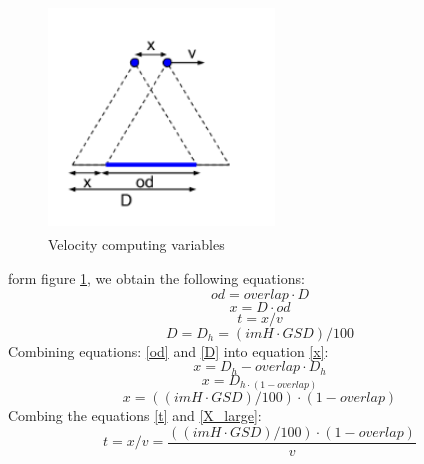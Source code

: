 \begin{figure}[H]
\centering
\includegraphics[width=6cm,height=6cm,keepaspectratio]{imagenes/velocity.PNG}
\caption{Velocity computing variables}
\label{fig:velocity}
\end{figure}
form figure \ref{fig:velocity}, we obtain the following equations:
\begin{equation}
od =overlap\cdot D
\label{od}
\end{equation}
\begin{equation}
x=D\cdot od
\label{x}
\end{equation}
\begin{equation}
t = x/v
\label{t}
\end{equation}
\begin{equation}
D=D_{h}=(imH\cdot GSD)/100
\label{D}
\end{equation}
Combining equations: \ref{od} and \ref{D} into equation \ref{x}:
\begin{equation}
x = D_{h}-overlap\cdot D_{h}
\end{equation}
\begin{equation}
x= D_{h\cdot (1-overlap)}
\end{equation}
\begin{equation}
x = ((imH\cdot GSD)/100)\cdot (1-overlap)
\label{X_large}
\end{equation}
Combing the equations \ref{t} and \ref{X_large}:
\begin{equation}
t=x/v=\frac{((imH\cdot GSD)/100)\cdot (1-overlap)}{v}
\end{equation}
